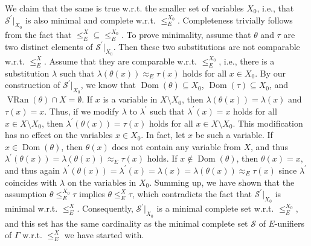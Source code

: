\documentclass[10pt,a4paper]{amsart}
\begin{document}
 
We claim that the same is true w.r.t. the smaller set of variables $X_{0}$, i.e., that $\mathcal{S}^{\prime}|_{X_{0}}$ is also minimal and complete w.r.t. $\leq_{E}^{X_{0}}$. Completeness trivially follows from the fact that ${\leq_{E}^{X}}\subseteq{\leq_{E}^{X_{0}}}$. To prove minimality, assume that $\theta$ and $\tau$ are two distinct elements of $\mathcal{S}^{\prime}|_{X_{0}}$. Then these two substitutions are not comparable w.r.t. $\leq_{E}^{X}$. Assume that they are comparable w.r.t. $\leq_{E}^{X_{0}}$, i.e., there is a substitution $\lambda$ such that $\lambda(\theta(x))\approx_{E}\tau(x)$ holds for all $x\in X_{0}$. By our construction of $\mathcal{S}^{\prime}|_{X_{0}}$, we know that $\operatorname{Dom}(\theta)\subseteq X_{0}$, $\operatorname{Dom}(\tau)\subseteq X_{0}$, and $\operatorname{VRan}(\theta)\cap X=\emptyset$. If $x$ is a variable in $X\setminus X_{0}$, then $\lambda(\theta(x))=\lambda(x)$ and $\tau(x)=x$. Thus, if we modify $\lambda$ to $\lambda^{\prime}$ such that $\lambda^{\prime}(x)=x$ holds for all $x\in X\setminus X_{0}$, then $\lambda^{\prime}(\theta(x))=\tau(x)$ holds for all $x\in X\setminus X_{0}$. This modification has no effect on the variables $x\in X_{0}$. In fact, let $x$ be such a variable. If $x\in\operatorname{Dom}(\theta)$, then $\theta(x)$ does not contain any variable from $X$, and thus $\lambda^{\prime}(\theta(x))=\lambda(\theta(x))\approx_{E}\tau(x)$ holds. If $x\notin\operatorname{Dom}(\theta)$, then $\theta(x)=x$, and thus again $\lambda^{\prime}(\theta(x))=\lambda^{\prime}(x)=\lambda(x)=\lambda(\theta(x))%
\approx_{E}\tau(x)$ since $\lambda^{\prime}$ coincides with $\lambda$ on the variables in $X_{0}$. Summing up, we have shown that the assumption $\theta\leq_{E}^{X_{0}}\tau$ implies $\theta\leq_{E}^{X}\tau$, which contradicts the fact that $\mathcal{S}^{\prime}|_{X_{0}}$ is minimal w.r.t. $\leq_{E}^{X}$. Consequently, $\mathcal{S}^{\prime}|_{X_{0}}$ is a minimal complete set w.r.t. $\leq_{E}^{X_{0}}$, and this set has the same cardinality as the minimal complete set $\mathcal{S}$ of $E$-unifiers of $\Gamma$ w.r.t. $\leq_{E}^{X}$ we have started with.\par
 
 
 
\end{document}
